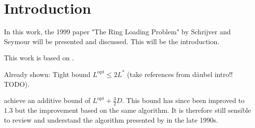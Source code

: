 \section{Introduction}

In this work, the 1999 paper "The Ring Loading Problem" by Schrijver and Seymour will be presented and discussed.
This will be the introduction.

This work is based on \citet{schrijver99}.

Already shown: Tight bound $L^\mathrm{opt} \leq 2 L^\ast$ (take references from däubel intro!! TODO).

\citet{schrijver99} achieve an additive bound of $L^\mathrm{opt} + \frac{3}{2}D$.
This bound has since been improved to $1.3$ but the improvement based on the same algorithm.
It is therefore still sensible to review and understand the algorithm presented by \citet{schrijver99} in the late 1990s.


